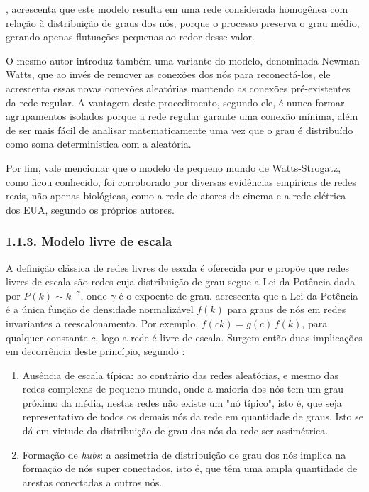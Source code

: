 \documentclass[12pt,oneside,a4paper,brazil,sumario=tradicional]{abntex2}
\begin{document}
\textcite{newman2003}, acrescenta que este modelo resulta em uma rede considerada homogênea com relação à distribuição de graus dos nós, porque o processo preserva o grau médio, gerando apenas flutuações pequenas ao redor desse valor.

O mesmo autor introduz também uma variante do modelo, denominada Newman-Watts, que ao invés de remover as conexões dos nós para reconectá-los, ele acrescenta essas novas conexões aleatórias mantendo as conexões pré-existentes da rede regular. A vantagem deste procedimento, segundo ele, é nunca formar agrupamentos isolados porque a rede regular garante uma conexão mínima, além de ser mais fácil de analisar matematicamente uma vez que o grau é distribuído como soma determinística com a aleatória.

Por fim, vale mencionar que o modelo de pequeno mundo de Watts-Strogatz, como ficou conhecido, foi corroborado por diversas evidências empíricas de redes reais, não apenas biológicas, como a rede de atores de cinema e a rede elétrica dos EUA, segundo os próprios autores.

\subsubsection*{1.1.3. Modelo livre de escala}
A definição clássica de redes livres de escala é oferecida por \textcite{albert2002} e propõe que redes livres de escala são redes cuja distribuição de grau segue a Lei da Potência dada por $P(k) \sim k^{-\gamma}$, onde $\gamma$ é o expoente de grau. \textcite{newman2005} acrescenta que a Lei da Potência é a única função de densidade normalizável $f(k)$ para graus de nós em redes invariantes a reescalonamento. Por exemplo, $f(ck) = g(c)\,f(k)$, para qualquer constante $c$, logo a rede é livre de escala. Surgem então duas implicações em decorrência deste princípio, segundo \textcite{albert2002}:

\begin{enumerate}
  \item Ausência de escala típica: ao contrário das redes aleatórias, e mesmo das redes complexas de pequeno mundo, onde a maioria dos nós tem um grau próximo da média, nestas redes não existe um "nó típico", isto é, que seja representativo de todos os demais nós da rede em quantidade de graus. Isto se dá em virtude da distribuição de grau dos nós da rede ser assimétrica.
  \item Formação de \textit{hubs}: a assimetria de distribuição de grau dos nós implica na formação de nós super conectados, isto é, que têm uma ampla quantidade de arestas conectadas a outros nós.
\end{enumerate}
\end{document}
